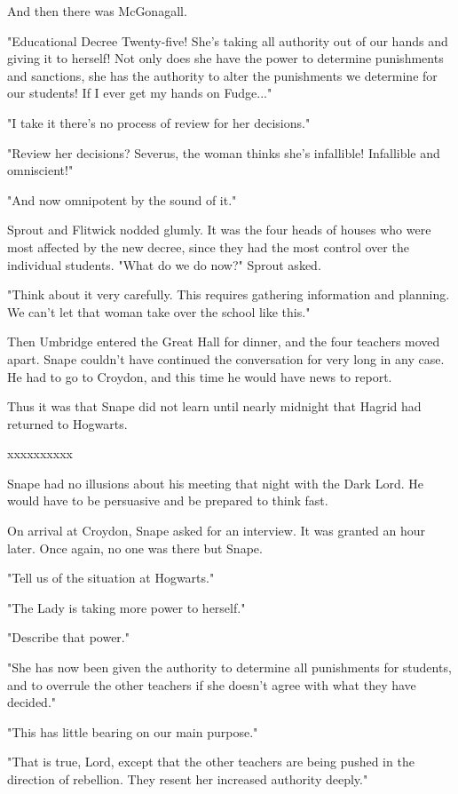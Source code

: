 \documentclass[a4paper,11pt]{article}
\begin{document}
And then there was McGonagall.

"Educational Decree Twenty-five! She's taking all authority out of our hands and giving it to herself! Not only does she have the power to determine punishments and sanctions, she has the authority to alter the punishments we determine for our students! If I ever get my hands on Fudge..."

"I take it there's no process of review for her decisions."

"Review her decisions? Severus, the woman thinks she's infallible! Infallible and omniscient!"

"And now omnipotent by the sound of it."

Sprout and Flitwick nodded glumly. It was the four heads of houses who were most affected by the new decree, since they had the most control over the individual students. "What do we do now?" Sprout asked.

"Think about it very carefully. This requires gathering information and planning. We can't let that woman take over the school like this."

Then Umbridge entered the Great Hall for dinner, and the four teachers moved apart. Snape couldn't have continued the conversation for very long in any case. He had to go to Croydon, and this time he would have news to report.

Thus it was that Snape did not learn until nearly midnight that Hagrid had returned to Hogwarts.

xxxxxxxxxx

Snape had no illusions about his meeting that night with the Dark Lord. He would have to be persuasive and be prepared to think fast.

On arrival at Croydon, Snape asked for an interview. It was granted an hour later. Once again, no one was there but Snape.

"Tell us of the situation at Hogwarts."

"The Lady is taking more power to herself."

"Describe that power."

"She has now been given the authority to determine all punishments for students, and to overrule the other teachers if she doesn't agree with what they have decided."

"This has little bearing on our main purpose."

"That is true, Lord, except that the other teachers are being pushed in the direction of rebellion. They resent her increased authority deeply."
\end{document}
